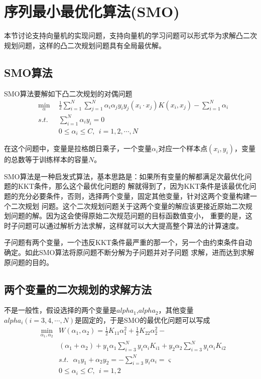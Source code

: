 \chapter{序列最小最优化算法(SMO)}

本节讨论支持向量机的实现问题，支持向量机的学习问题可以形式华为求解凸二次规划问题，这样的凸二次规划问题具有全局最优解。

\section{SMO算法}

SMO算法要解如下凸二次规划的对偶问题
\begin{eqnarray}
    & \min\limits_{\alpha} \ \ &\frac{1}{2}\sum\limits_{i=1}^{N}\sum\limits_{j=1}^{N}
    \alpha_i\alpha_jy_iy_j(x_i\cdot x_j)K(x_i,x_j)-\sum\limits_{i=1}^{N}\alpha_i\\
    & s.t. & \sum\limits_{i=1}^{N}\alpha_iy_i=0\\
    &      & 0\leqslant \alpha_i\leqslant C,\ \ i=1,2,\cdots,N
\end{eqnarray}

在这个问题中，变量是拉格朗日乘子，一个变量$\alpha_i$对应一个样本点$(x_i,y_i)$，变量的总数等于训练样本的容量$N$。

SMO算法是一种启发式算法，基本思路是：如果所有变量的解都满足次最优化问题的KKT条件，那么这个最优化问题的
解就得到了，因为KKT条件是该最优化问题的充分必要条件，否则，选择两个变量，固定其他变量，针对这两个变量构建一个二次规划
问题。这个二次规划问题关于这两个变量的解应该更接近原始二次规划问题的解。因为这会使得原始二次规范问题的目标函数值变小，
重要的是，这时子问题可以通过解析方法求解，这样就可以大大提高整个算法的计算速度。

子问题有两个变量，一个违反KKT条件最严重的那一个，另一个由约束条件自动确定。如此SMO算法将原问题不断分解为子问题并对子问题
求解，进而达到求解原问题的目的。

\section{两个变量的二次规划的求解方法}

不是一般性，假设选择的两个变量是$alpha_1$,$alpha_2$，其他变量$alpha_i(i=3,4,\cdots,N)$是固定的，于是SMO的最优化问题可以写成
\begin{eqnarray}
    & \min\limits_{\alpha_1,\alpha_2} & W(\alpha_1,\alpha_2)= \frac{1}{2}K_{11}\alpha^2_1+\frac{1}{2}K_{22}\alpha^2_2-\nonumber\\
    & & (\alpha_1+\alpha_2)+y_1\alpha_1\sum\limits_{i=3}^{N}y_i\alpha_i K_{i1}+y_2\alpha_2\sum\limits_{i=3}^{N}y_i\alpha_iK_{i2}\label{eq:7.101}\\
    & & s.t.\ \ \ \alpha_1y_1+\alpha_2y_2=-\sum\limits_{i=3}^{N}y_i\alpha_i=\varsigma\label{eq:7.102}\\
    & & 0\leqslant \alpha_i\leqslant C,\ \ i=1,2\label{eq:7.103}
\end{eqnarray}

